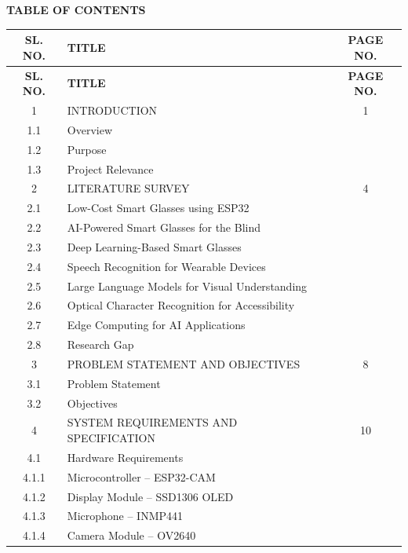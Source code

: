 \thispagestyle{empty}
\begin{center}
\textbf{\Large TABLE OF CONTENTS}\\[0.5cm]
\end{center}

\begin{longtable}{|c|p{9cm}|c|}
\hline
\textbf{SL. NO.} & \textbf{TITLE} & \textbf{PAGE NO.} \\
\hline
\endfirsthead
\hline
\textbf{SL. NO.} & \textbf{TITLE} & \textbf{PAGE NO.} \\
\hline
\endhead
1 & INTRODUCTION & 1 \\
1.1 & \quad Overview & \\
1.2 & \quad Purpose & \\
1.3 & \quad Project Relevance & \\
\hline
2 & LITERATURE SURVEY & 4 \\
2.1 & \quad Low-Cost Smart Glasses using ESP32 & \\
2.2 & \quad AI-Powered Smart Glasses for the Blind & \\
2.3 & \quad Deep Learning-Based Smart Glasses & \\
2.4 & \quad Speech Recognition for Wearable Devices & \\
2.5 & \quad Large Language Models for Visual Understanding & \\
2.6 & \quad Optical Character Recognition for Accessibility & \\
2.7 & \quad Edge Computing for AI Applications & \\
2.8 & \quad Research Gap & \\
\hline
3 & PROBLEM STATEMENT AND OBJECTIVES & 8 \\
3.1 & \quad Problem Statement & \\
3.2 & \quad Objectives & \\
\hline
4 & SYSTEM REQUIREMENTS AND SPECIFICATION & 10 \\
4.1 & \quad Hardware Requirements & \\
4.1.1 & \qquad Microcontroller -- ESP32-CAM & \\
4.1.2 & \qquad Display Module -- SSD1306 OLED & \\
4.1.3 & \qquad Microphone -- INMP441 & \\
4.1.4 & \qquad Camera Module -- OV2640 & \\

\end{longtable}
